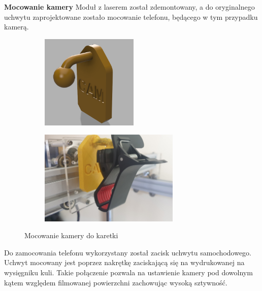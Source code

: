 \textbf{Mocowanie kamery} \newline
Moduł z laserem został zdemontowany, a do oryginalnego uchwytu zaprojektowane zostało mocowanie telefonu, będącego w tym przypadku kamerą. 
\begin{figure}[H]
	\centering
	\begin{subfigure}{}
		\includegraphics[height=4.5cm]{pages/dodatekARobot/img/model3DMocowaniaKamery.png}
	\end{subfigure}
	\begin{subfigure}{}
		\includegraphics[height=4.5cm]{pages/dodatekARobot/img/mocowanieUchwytu.jpg}
	\end{subfigure}
	\caption{Mocowanie kamery do karetki}
\end{figure}
Do zamocowania telefonu wykorzystany został zacisk uchwytu samochodowego.
Uchwyt mocowany jest poprzez nakrętkę zaciskającą się na wydrukowanej na wysięgniku kuli. 
Takie połączenie pozwala na ustawienie kamery pod dowolnym kątem względem filmowanej powierzchni zachowując wysoką sztywność.
